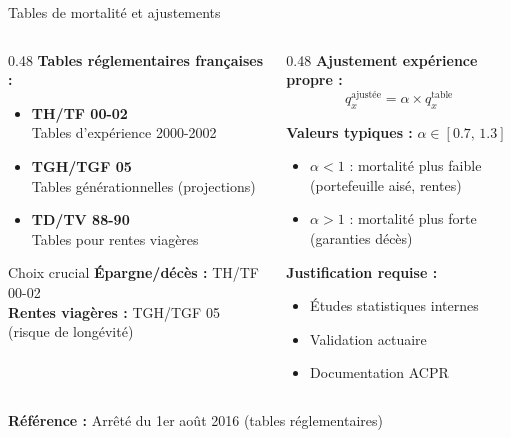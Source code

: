 \documentclass[10pt,aspectratio=169]{beamer}
\begin{document}
\begin{frame}{Tables de mortalité et ajustements}
\begin{columns}[T]
\begin{column}{0.48\textwidth}
\textbf{Tables réglementaires françaises :}
\begin{itemize}
    \item \textbf{TH/TF 00-02}\\
    {\scriptsize Tables d'expérience 2000-2002}
    \item \textbf{TGH/TGF 05}\\
    {\scriptsize Tables générationnelles (projections)}
    \item \textbf{TD/TV 88-90}\\
    {\scriptsize Tables pour rentes viagères}
\end{itemize}

\vspace{0.3cm}
\begin{alertblock}{Choix crucial}
\textbf{Épargne/décès :} TH/TF 00-02\\
\textbf{Rentes viagères :} TGH/TGF 05\\
(risque de longévité)
\end{alertblock}
\end{column}
\begin{column}{0.48\textwidth}
\textbf{Ajustement expérience propre :}
\[
\boxed{q_x^{\text{ajustée}} = \alpha \times q_x^{\text{table}}}
\]

\textbf{Valeurs typiques :} $\alpha \in [0.7, \, 1.3]$

\vspace{0.3cm}
\begin{itemize}
    \item $\alpha < 1$ : mortalité plus faible\\
    {\scriptsize (portefeuille aisé, rentes)}
    \item $\alpha > 1$ : mortalité plus forte\\
    {\scriptsize (garanties décès)}
\end{itemize}

\vspace{0.3cm}
\textbf{Justification requise :}
\begin{itemize}
    \item Études statistiques internes
    \item Validation actuaire
    \item Documentation ACPR
\end{itemize}
\end{column}
\end{columns}

\textbf{Référence :} Arrêté du 1er août 2016 (tables réglementaires)
\end{frame}
\end{document}
